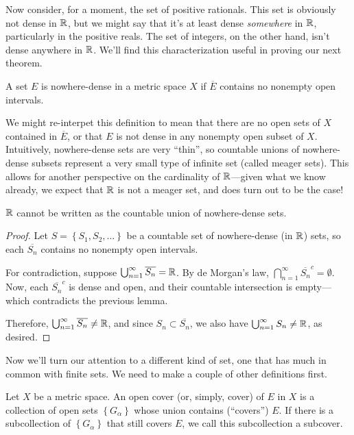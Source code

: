 \documentclass[../m131main.tex]{subfiles}
\begin{document}
Now consider, for a moment, the set of positive rationals.
This set is obviously not dense in $\mathbb{R}$, but we might say that it's at least dense \textit{somewhere} in $\mathbb{R}$, particularly in the positive reals.
The set of integers, on the other hand, isn't dense anywhere in $\mathbb{R}$.
We'll find this characterization useful in proving our next theorem.

\begin{definition}
    A set $E$ is nowhere-dense in a metric space $X$ if $\overline{E}$ contains no nonempty open intervals.
\end{definition}

We might re-interpet this definition to mean that there are no open sets of $X$ contained in $\overline{E}$, or that $E$ is not dense in any nonempty open subset of $X$.
Intuitively, nowhere-dense sets are very ``thin'', so countable unions of nowhere-dense subsets represent a very small type of infinite set (called meager sets).
This allows for another perspective on the cardinality of $\mathbb{R}$---given what we know already, we expect that $\mathbb{R}$ is not a meager set, and does turn out to be the case!

\begin{theorem}
    $\mathbb{R}$ cannot be written as the countable union of nowhere-dense sets.
\end{theorem}

\begin{proof}
    Let $S = \left\{ S_1, S_2, \ldots \right\}$ be a countable set of nowhere-dense (in $\mathbb{R}$) sets, so each $\overline{S_n}$ contains no nonempty open intervals.

    For contradiction, suppose $\bigcup_{n=1}^\infty \overline{S_n} = \mathbb{R}$.
    By de Morgan's law, $\bigcap_{n=1}^\infty \overline{S_n}^c = \emptyset$.
    Now, each $\overline{S_n}^c$ is dense and open, and their countable intersection is empty---which contradicts the previous lemma.

    Therefore, $\bigcup_{n=1}^\infty \overline{S_n} \neq \mathbb{R}$, and since $S_n \subset \overline{S_n}$, we also have $\bigcup_{n=1}^\infty S_n \neq \mathbb{R}$, as desired.
\end{proof}

Now we'll turn our attention to a different kind of set, one that has much in common with finite sets.
We need to make a couple of other definitions first.

\begin{definition}[Cover]
    Let $X$ be a metric space.
    An open cover (or, simply, cover) of $E$ in $X$ is a collection of open sets $\left\{ G_\alpha \right\}$ whose union contains (``covers'') $E$.
    If there is a subcollection of $\left\{ G_\alpha \right\}$ that still covers $E$, we call this subcollection a subcover.
\end{definition}
\end{document}
